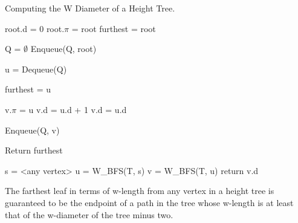 \begin{algorithm}
\caption{Computing the W Diameter of a Height Tree.}

\begin{algorithmic}[1]

    \State root.d = 0
    \State root.$\pi$ = root
    \State furthest = root

    \State Q = $\emptyset$
    \State Enqueue(Q, root)

        \State u = Dequeue(Q)

            \State furthest = u
        \EndIf

                \State v.$\pi$ = u
                    \State v.d = u.d + 1
                \Else
                    \State v.d = u.d
                \EndIf

                \State Enqueue(Q, v)

            \EndIf
        \EndFor
    \EndWhile
    \State Return furthest
\EndFunction

    \State s = <any vertex>
    \State u = W\_BFS(T, s)
    \State v = W\_BFS(T, u)
    \State return v.d
\EndFunction

\end{algorithmic}
\end{algorithm}




\begin{lem} The farthest leaf in terms of w-length from any vertex in a height tree is guaranteed to be the endpoint of a path in the tree whose w-length is at least that of the w-diameter of the tree minus two. \end{lem}



